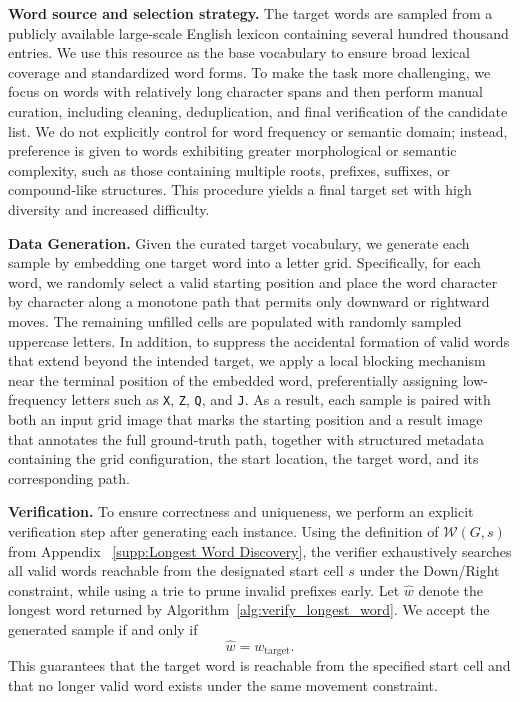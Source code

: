 \documentclass{llmxive}
\begin{document}
\textbf{Word source and selection strategy.}
The target words are sampled from a publicly available large-scale English lexicon containing several hundred thousand entries. 
We use this resource as the base vocabulary to ensure broad lexical coverage and standardized word forms. To make the task more challenging, we focus on words with relatively long character spans and then perform manual curation,
including cleaning, deduplication, and final verification of the candidate
list. We do not explicitly control for word frequency or semantic domain;
instead, preference is given to words exhibiting greater morphological or
semantic complexity, such as those containing multiple roots, prefixes,
suffixes, or compound-like structures. This procedure yields a final target
set with high diversity and increased difficulty.

\textbf{Data Generation.}
Given the curated target vocabulary, we generate each sample by embedding one
target word into a letter grid. Specifically, for each word, we randomly
select a valid starting position and place the word character by character
along a monotone path that permits only downward or rightward moves. 
The remaining unfilled cells are populated with randomly sampled uppercase letters. 
In addition, to suppress the accidental formation of valid words that
extend beyond the intended target, we apply a local blocking mechanism near
the terminal position of the embedded word, preferentially assigning
low-frequency letters such as \texttt{X}, \texttt{Z}, \texttt{Q}, and
\texttt{J}. As a result, each sample is paired with both an input grid image
that marks the starting position and a result image that annotates the full
ground-truth path, together with structured metadata containing the grid
configuration, the start location, the target word, and its corresponding
path.

\textbf{Verification.}
To ensure correctness and uniqueness, we perform an explicit verification step
after generating each instance. Using the definition of $\mathcal{W}(G,s)$ from Appendix ~\ref{supp:Longest Word Discovery}, the verifier exhaustively searches all valid words reachable from
the designated start cell $s$ under the Down/Right constraint, while using a
trie to prune invalid prefixes early. Let $\hat{w}$ denote the longest word
returned by Algorithm~\ref{alg:verify_longest_word}. We accept the generated
sample if and only if
\begin{equation}
    \hat{w} = w_{\text{target}}.
\end{equation}
This guarantees that the target word is reachable from the specified start cell
and that no longer valid word exists under the same movement constraint.
\end{document}
